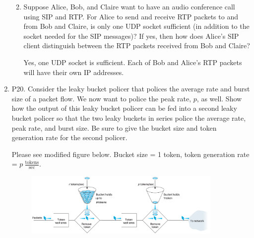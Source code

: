 \documentclass[12pt]{article}
\begin{document}
\begin{enumerate}
\begin{enumerate}
			\color{black}
			\item Suppose Alice, Bob, and Claire want to have an audio conference call using SIP and RTP. For Alice to send and receive RTP packets to and from Bob and Claire, is only one UDP socket sufficient (in addition to the socket needed for the SIP messages)? If yes, then how does Alice’s SIP client distinguish between the RTP packets received from Bob and Claire?\par
			\color{CrispBlue}
			Yes, one UDP socket is sufficient. Each of Bob and Alice's RTP packets will have their own IP addresses.
			\color{black}
		\end{enumerate}
	\item P20. Consider the leaky bucket policer that polices the average rate and burst size of a packet flow. We now want to police the peak rate, \(p\), as well. Show how the output of this leaky bucket policer can be fed into a second leaky bucket policer so that the two leaky buckets in series police the average rate, peak rate, and burst size. Be sure to give the bucket size and token generation rate for the second policer.\par
	\color{CrispBlue}
	Please see modified figure below. Bucket size = 1 token, token generation rate = \(p\ \frac{\text{tokens}}{\text{sec}}\).
	\begin{figure}[h!]
		\centering
		\includegraphics[width=0.9\textwidth]{./Images/Fig09-000.png}
		\end{figure}
	\color{black}
\end{enumerate}
\end{document}
